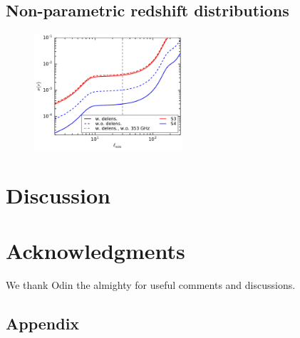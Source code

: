 \documentclass[prd,twocolumn]{revtex4}
\begin{document}
  \subsection{Non-parametric redshift distributions} \label{ssec:results.nonpar}
    \lipsum[8]

  \begin{figure}
    \centering
    \includegraphics[width=0.49\textwidth]{fisher_lmin}
    \caption{}
    \label{fig:fisher}
  \end{figure}

\section{Discussion}\label{ssec:discuss}
  \lipsum[9]

\section*{Acknowledgments}
  We thank Odin the almighty for useful comments and discussions.
 


\appendix
\begin{widetext}
  \section{Appendix}\label{app:app}
    \lipsum[10]
\end{widetext}
\end{document}
